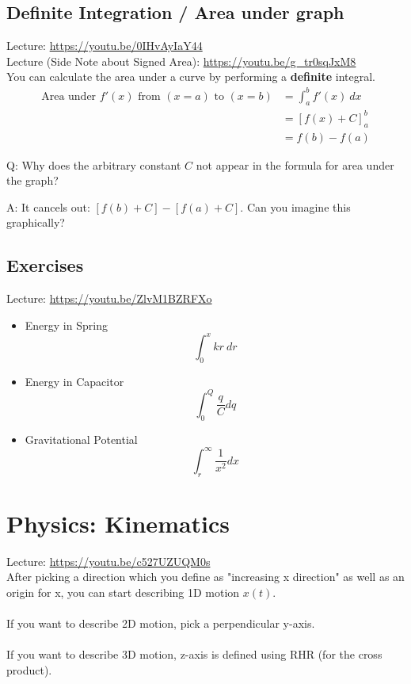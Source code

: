 \documentclass{article}
\begin{document}
\subsection{Definite Integration / Area under graph}
Lecture: \url{https://youtu.be/0IHvAyIaY44}\\[10pt]
Lecture (Side Note about Signed Area): \url{https://youtu.be/g_tr0sqJxM8}\\[10pt]
You can calculate the area under a curve by performing a \textbf{definite} integral.
\begin{align}
    \text{Area under }f'(x)\text{ from }(x=a)\text{ to }(x=b) &= \int_a^b f'(x)\ dx  \\
    &= \left[f(x) + C\right]^b_a \\
    &= f(b) - f(a)
\end{align}

Q: Why does the arbitrary constant $C$ not appear in the formula for area under the graph? 

A: It cancels out: $[f(b) + C] - [f(a) + C]$. Can you imagine this graphically? 

\subsection{Exercises}
Lecture: \url{https://youtu.be/ZlvM1BZRFXo}\\[10pt]
\begin{itemize}
    \item Energy in Spring
        $$\int_0^x kr\ dr$$
    \item Energy in Capacitor
        $$\int_0^Q \frac{q}{C} dq$$
    \item Gravitational Potential
        $$\int_{r}^{\infty} \frac{1}{x^2} dx$$
\end{itemize}

\section{Physics: Kinematics}
Lecture: \url{https://youtu.be/c527UZUQM0s} \\[10pt]
After picking a direction which you define as "increasing x direction" as well as an origin for x, you can start describing 1D motion $x(t)$.\\
\\
If you want to describe 2D motion, pick a perpendicular y-axis. \\
\\
If you want to describe 3D motion, z-axis is defined using RHR (for the cross product).
\end{document}
